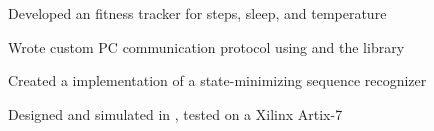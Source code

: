 \documentclass[]{deedy-resume-openfont}
\begin{document}
\begin{minipage}[t]{0.66\textwidth}

\descript{}
\begin{tightemize}
\item Developed an  fitness tracker for steps, sleep, and temperature
\item Wrote custom PC communication protocol using  and the  library
\end{tightemize}
\sectionsep

\descript{}
\begin{tightemize}
\item Created a  implementation of a state-minimizing sequence recognizer
\item Designed and simulated in , tested on a Xilinx Artix-7 
\end{tightemize}
\sectionsep




\end{minipage}
\end{document}
